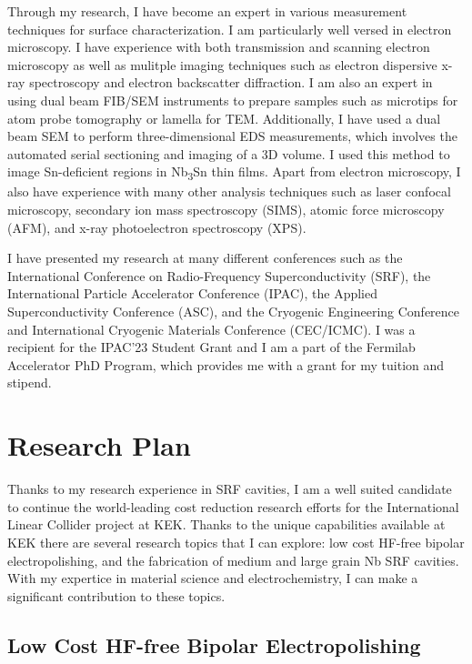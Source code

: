 \documentclass[]{revtex4-2}
\begin{document}
    Through my research, I have become an expert in various measurement techniques for surface characterization. I am particularly well versed in electron microscopy. I have experience with both transmission and scanning electron microscopy\cite{viklund2023improving} as well as mulitple imaging techniques such as electron dispersive x-ray spectroscopy and electron backscatter diffraction. I am also an expert in using dual beam FIB/SEM instruments to prepare samples such as microtips for atom probe tomography or lamella for TEM. Additionally, I have used a dual beam SEM to perform three-dimensional EDS measurements, which involves the automated serial sectioning and imaging of a 3D volume. I used this method to image Sn-deficient regions in Nb\textsubscript{3}Sn thin films. \cite{viklund2023three} Apart from electron microscopy, I also have experience with many other analysis techniques such as laser confocal microscopy, secondary ion mass spectroscopy (SIMS), atomic force microscopy (AFM), and x-ray photoelectron spectroscopy (XPS).

    I have presented my research at many different conferences such as the International Conference on Radio-Frequency Superconductivity (SRF), the International Particle Accelerator Conference (IPAC), the Applied Superconductivity Conference (ASC), and the Cryogenic Engineering Conference and International Cryogenic Materials Conference (CEC/ICMC). I was a recipient for the IPAC'23 Student Grant and I am a part of the Fermilab Accelerator PhD Program, which provides me with a grant for my tuition and stipend.





\section{Research Plan}


    Thanks to my research experience in SRF cavities, I am a well suited candidate to continue the world-leading cost reduction research efforts for the International Linear Collider project at KEK. Thanks to the unique capabilities available at KEK there are several research topics that I can explore: low cost HF-free bipolar electropolishing, and the fabrication of medium and large grain Nb SRF cavities. With my expertice in material science and electrochemistry, I can make a significant contribution to these topics.
    

\subsection{Low Cost HF-free Bipolar Electropolishing}
\end{document}
